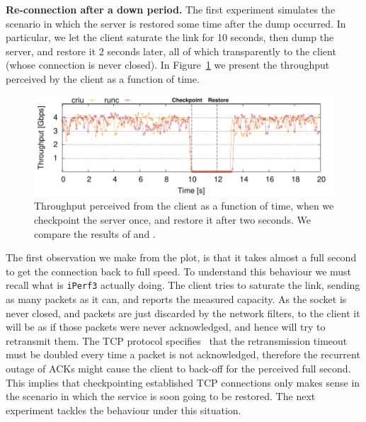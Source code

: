 \textbf{Re-connection after a down period.}
The first experiment simulates the scenario in which the server is restored some time after the dump occurred.
In particular, we let the client saturate the link for 10 seconds, then dump the server, and restore it 2 seconds later, all of which transparently to the client (whose connection is never closed).
In Figure~\ref{fig:evaluation-downtime} we present the throughput perceived by the client as a function of time. 
\begin{figure}[h!]
    \centering
    \includegraphics[width=\linewidth]{./figs/tcp-established-downtime/tcp_established_downtime_microbenchmark.pdf}
    \caption[Throughput over time after a long off period]{Throughput perceived from the client as a function of time, when we checkpoint the server once, and restore it after two seconds. We compare the results of \criu and \runc. \label{fig:evaluation-downtime}}
\end{figure}
The first observation we make from the plot, is that it takes almost a full second to get the connection back to full speed.
To understand this behaviour we must recall what is \texttt{iPerf3} actually doing.
The client tries to saturate the link, sending as many packets as it can, and reports the measured capacity.
As the socket is never closed, and packets are just discarded by the network filters, to the client it will be as if those packets were never acknowledged, and hence will try to retransmit them.
The TCP protocol specifies~\cite{tcp-rfc} that the retransmission timeout must be doubled every time a packet is not acknowledged, therefore the recurrent outage of ACKs might cause the client to back-off for the perceived full second.
This implies that checkpointing established TCP connections only makes sense in the scenario in which the service is soon going to be restored.
The next experiment tackles the behaviour under this situation.

